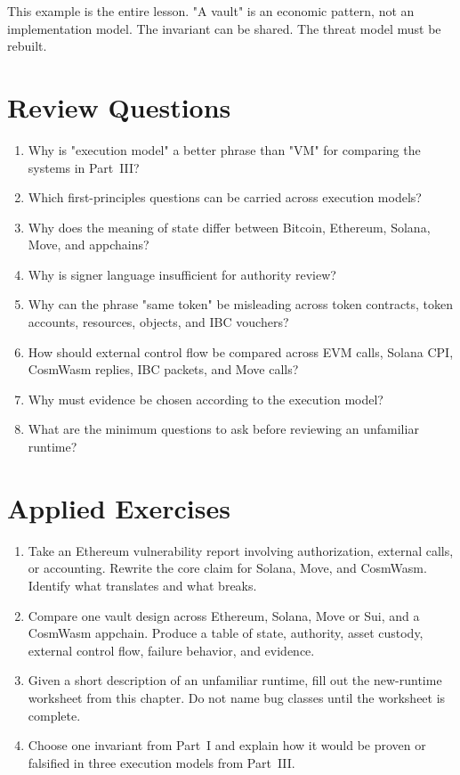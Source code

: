 This example is the entire lesson. "A vault" is an economic pattern, not an implementation model. The invariant can be shared. The threat model must be rebuilt.

\section*{Review Questions}

\begin{enumerate}
\item Why is "execution model" a better phrase than "VM" for comparing the systems in Part~III?
\item Which first-principles questions can be carried across execution models?
\item Why does the meaning of state differ between Bitcoin, Ethereum, Solana, Move, and appchains?
\item Why is signer language insufficient for authority review?
\item Why can the phrase "same token" be misleading across token contracts, token accounts, resources, objects, and IBC vouchers?
\item How should external control flow be compared across EVM calls, Solana CPI, CosmWasm replies, IBC packets, and Move calls?
\item Why must evidence be chosen according to the execution model?
\item What are the minimum questions to ask before reviewing an unfamiliar runtime?
\end{enumerate}

\section*{Applied Exercises}

\begin{enumerate}
\item Take an Ethereum vulnerability report involving authorization, external calls, or accounting. Rewrite the core claim for Solana, Move, and CosmWasm. Identify what translates and what breaks.

\item Compare one vault design across Ethereum, Solana, Move or Sui, and a CosmWasm appchain. Produce a table of state, authority, asset custody, external control flow, failure behavior, and evidence.

\item Given a short description of an unfamiliar runtime, fill out the new-runtime worksheet from this chapter. Do not name bug classes until the worksheet is complete.

\item Choose one invariant from Part~I and explain how it would be proven or falsified in three execution models from Part~III.
\end{enumerate}
